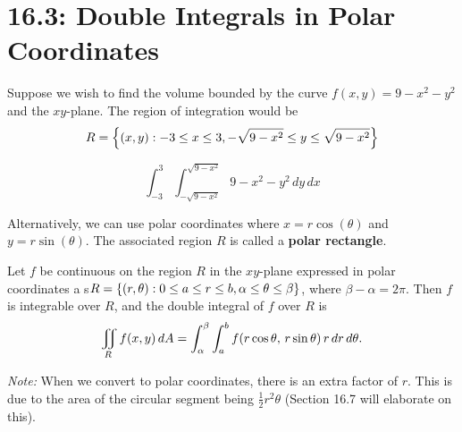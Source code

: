 \documentclass[../mathNotesPreamble]{subfiles}
\begin{document}
\section{16.3: Double Integrals in Polar Coordinates}

  Suppose we wish to find the volume bounded by the curve $f(x,y)=9-x^2-y^2$ and the $xy$-plane. The region of integration would be 
    \[R={\left\{(x,y): -3\leq x\leq 3, -\sqrt{9-x^2}\leq y\leq \sqrt{9-x^2}\right\}}\]

    \noindent
    \begin{minipage}{0.5\linewidth}
      \[\int_{-3}^{3}\int_{-\sqrt{9-x^2}}^{\sqrt{9-x^2}} 9-x^2-y^2\,dy\,dx\]
    \end{minipage}%
    \begin{minipage}{0.5\linewidth}
      \begin{flushright}
      \end{flushright}
    \end{minipage}%

  \noindent
  Alternatively, we can use polar coordinates where $x=r\cos(\theta)$ and $y=r\sin(\theta)$. The associated region $R$ is called a \textbf{polar rectangle}.

  \begin{thmBox*}
    Let $f$ be continuous on the region $R$ in the $xy$-plane expressed in polar coordinates a s$R={\left\{(r,\theta): 0\leq a\leq r\leq b, \alpha\leq\theta\leq \beta\right\}}$, where $\beta-\alpha=2\pi$. Then $f$ is integrable over $R$, and the double integral of $f$ over $R$ is
      \[\iint\limits_R f(x,y)\,dA=\int_\alpha^\beta \int_a^b f{\left(r\cos\theta,\, r\sin\theta\right)}\,r\,dr\,d\theta.\]
  \end{thmBox*}
  \textit{Note:} When we convert to polar coordinates, there is an extra factor of $r$. This is due to the area of the circular segment being $\frac{1}{2}r^2\theta$ (Section 16.7 will elaborate on this).
  \pagebreak
\end{document}
